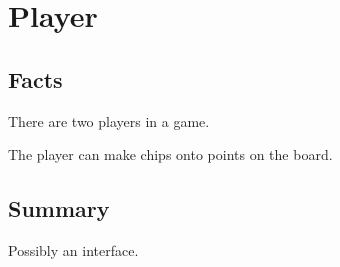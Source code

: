 \section{Player}

\subsection{Facts}

\begin{dashed}
    \item There are two players in a game.
    \item The player can make chips onto points on the board.
\end{dashed}


\subsection{Summary}
Possibly an interface.
